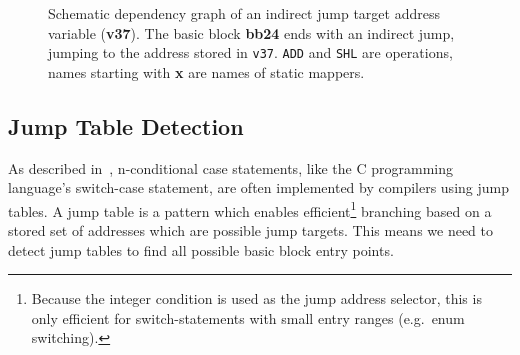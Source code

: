 \documentclass[course=eragp]{aspdoc}
\begin{document}
\begin{figure}
    \caption{
        Schematic dependency graph of an indirect jump target address variable (\textbf{v37}). The basic block \textbf{bb24} ends
        with an indirect jump, jumping to the address stored in \texttt{v37}. \texttt{ADD} and \texttt{SHL}
        are operations, names starting with \textbf{x} are names of static mappers.\\
    }\label{backtracking_graph}
\end{figure}


\subsection{Jump Table Detection}

As described in\ \cite{jump_table_paper}, n-conditional case statements, like the C programming
language's switch-case statement, are often implemented by compilers using jump
tables. A jump table is a pattern which enables efficient\footnote{Because the integer condition is
    used as the jump address selector, this is only efficient for switch-statements with small entry
    ranges (e.g.\ enum switching).} branching based
on a stored set of addresses which are possible jump targets. This means we need to detect jump tables to find
all possible basic block entry points.
\end{document}
